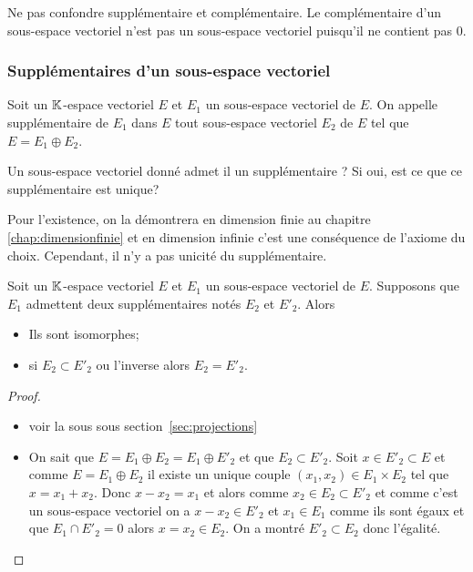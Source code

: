 Ne pas confondre supplémentaire et complémentaire. Le complémentaire d'un 
sous-espace vectoriel n'est pas un sous-espace vectoriel puisqu'il ne contient 
pas \(0\).

\subsubsection{Supplémentaires d'un sous-espace vectoriel}

\begin{defdef}
  Soit un \(\mathbb{K}\)-espace vectoriel \(E\) et \(E_1\) un sous-espace vectoriel de 
  \(E\). On appelle supplémentaire de \(E_1\) dans \(E\) tout sous-espace 
  vectoriel \(E_2\) de \(E\) tel que \(E= E_1 \oplus E_2\).
\end{defdef}

Un sous-espace vectoriel donné admet il un supplémentaire ? Si oui, est ce que ce 
supplémentaire est unique?

Pour l'existence, on la démontrera en dimension finie au chapitre~
\ref{chap:dimensionfinie} et en dimension infinie c'est une conséquence de 
l'axiome du choix. Cependant, il n'y a pas unicité du supplémentaire.

\begin{prop}
  \label{prop:deuxsuppiso}
  Soit un \(\mathbb{K}\)-espace vectoriel \(E\) et \(E_1\) un sous-espace vectoriel de 
  \(E\). Supposons que \(E_1\) admettent deux supplémentaires notés \(E_2\) et 
  \(E'_2\). Alors
  \begin{itemize}
    \item Ils sont isomorphes;
    \item si \(E_2 \subset E'_2\) ou l'inverse alors \(E_2=E'_2\).
  \end{itemize}
\end{prop}
\begin{proof}
  \begin{itemize}
    \item voir la sous sous section~\ref{sec:projections}
    \item On sait que \(E=E_1 \oplus E_2=E_1 \oplus E'_2\) et que \(E_2 \subset 
      E'_2\). Soit \(x \in E'_2 \subset E\) et comme \(E=E_1 \oplus E_2\) il 
      existe un unique couple \((x_1,x_2 ) \in E_1 \times E_2\) tel que 
      \(x=x_1+x_2\). Donc \(x-x_2=x_1\) et alors comme \(x_2 \in E_2 \subset 
      E'_2\) et comme c'est un sous-espace vectoriel on a \(x-x_2\in E'_2\)  et 
      \(x_1 \in E_1\) comme ils sont égaux et que \(E_1 \cap E'_2=0\)  alors 
      \(x=x_2 \in E_2\). On a montré \(E'_2 \subset E_2\) donc l'égalité.
  \end{itemize}
\end{proof}

